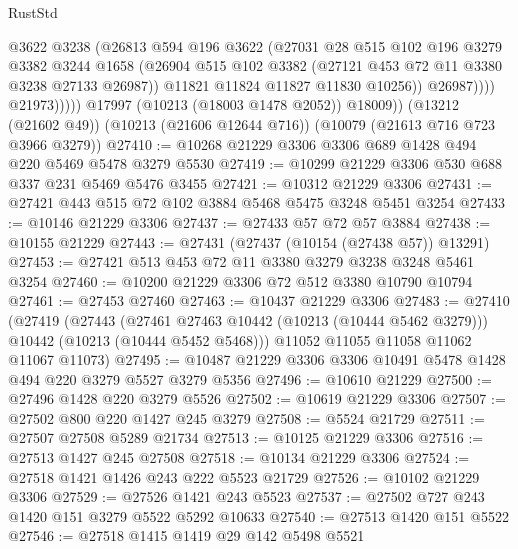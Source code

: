 \begin{lexlean}{RustStd}
\begin{coremodule}
{\begin{coremodule}
{{{{{{{{{{{{{{{{{{{{{{{{{{                          @3622
                          @3238
                          (@26813
                            @594
                            @196
                            @3622
                            (@27031
                              @28
                              @515
                              @102
                              @196
                              @3279
                              @3382
                              @3244
                              @1658
                              (@26904
                                @515
                                @102
                                @3382
                                (@27121 @453 @72 @11 @3380 @3238 @27133 @26987))
                              @11821
                              @11824
                              @11827
                              @11830
                              @10256))
                          @26987))))
                  @21973)))))
        @17997
        (@10213 (@18003 @1478 @2052))
        @18009))
    (@13212 (@21602 @49))
    (@10213 (@21606 @12644 @716))
    (@10079 (@21613 @716 @723 @3966 @3279))
@27410 := @10268 @21229 @3306 @3306 @689 @1428 @494 @220 @5469 @5478 @3279 @5530
@27419 := @10299 @21229 @3306 @530 @688 @337 @231 @5469 @5476 @3455
@27421 := @10312 @21229 @3306
@27431 := @27421 @443 @515 @72 @102 @3884 @5468 @5475 @3248 @5451 @3254
@27433 := @10146 @21229 @3306
@27437 := @27433 @57 @72 @57 @3884
@27438 := @10155 @21229
@27443 := @27431 (@27437 (@10154 (@27438 @57)) @13291)
@27453 := @27421 @513 @453 @72 @11 @3380 @3279 @3238 @3248 @5461 @3254
@27460 := @10200 @21229 @3306 @72 @512 @3380 @10790 @10794
@27461 := @27453 @27460
@27463 := @10437 @21229 @3306
@27483 := @27410
    (@27419
      (@27443
        (@27461 @27463 @10442 (@10213 (@10444 @5462 @3279)))
        @10442
        (@10213 (@10444 @5452 @5468)))
      @11052
      @11055
      @11058
      @11062
      @11067
      @11073)
@27495 := @10487 @21229 @3306 @3306 @10491 @5478 @1428 @494 @220 @3279 @5527 @3279 @5356
@27496 := @10610 @21229
@27500 := @27496 @1428 @220 @3279 @5526
@27502 := @10619 @21229 @3306
@27507 := @27502 @800 @220 @1427 @245 @3279
@27508 := @5524 @21729
@27511 := @27507 @27508 @5289 @21734
@27513 := @10125 @21229 @3306
@27516 := @27513 @1427 @245 @27508
@27518 := @10134 @21229 @3306
@27524 := @27518 @1421 @1426 @243 @222 @5523 @21729
@27526 := @10102 @21229 @3306
@27529 := @27526 @1421 @243 @5523
@27537 := @27502 @727 @243 @1420 @151 @3279 @5522 @5292 @10633
@27540 := @27513 @1420 @151 @5522
@27546 := @27518 @1415 @1419 @29 @142 @5498 @5521
}}}}}}}}}}}}}}}}}}}}}}}}}}
\end{coremodule}}
\end{coremodule}
\end{lexlean}
